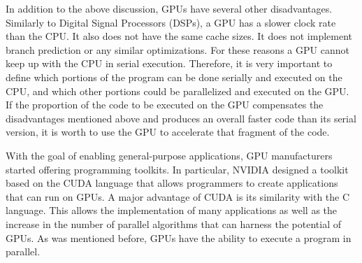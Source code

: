 \documentclass[Ingles]{ic-tese-v1}
\begin{document}
In addition to the above discussion, GPUs have several other
disadvantages.  Similarly to Digital Signal Processors (DSPs), a GPU has a
slower clock rate than the CPU. It also does not have the same cache sizes.
It does not implement branch prediction or any similar optimizations. For these
reasons a GPU cannot keep up with the CPU in serial
execution. Therefore, it is very important to define which portions of
the program can be done serially and executed on the CPU, and which other
portions could be parallelized and executed on the GPU. If the proportion of
the code to be executed on the GPU compensates the disadvantages mentioned
above and produces an overall faster code than its serial version, it is worth to use the
GPU to accelerate  that fragment of the code.

With the goal of enabling general-purpose applications, GPU manufacturers
started offering programming  toolkits. In particular, NVIDIA designed a toolkit
based on the CUDA  language that  allows programmers to create applications
that can run on GPUs. A major advantage
of CUDA is its similarity with the C language.  This allows the implementation
of many applications as well as the increase in the number of parallel
algorithms that can  harness the potential of GPUs. As was mentioned before, GPUs
have the ability to execute a program in parallel.
\end{document}
